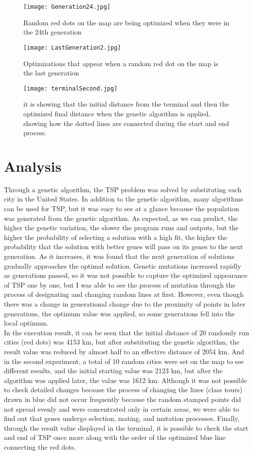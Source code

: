\documentclass[12pt]{article}
\begin{document}
\begin{figure}[h]
    \texttt{[image: Generation24.jpg]}
    \caption{\label{fig:reults}Random red dots on the map are being optimized when they were in the 24th generation}

    \texttt{[image: LastGeneration2.jpg]}
    \caption{\label{fig:reults}Optimizations that appear when a random red dot on the map is the last generation}
\end{figure}
\newpage
\begin{figure}[h]
    \texttt{[image: terminalSecond.jpg]}
    \caption{\label{fig:reults}it is showing that the initial distance from the terminal and then the optimized final distance when the genetic algorithm is applied, showing how the dotted lines are connected during the start and end process.} 
\end{figure}
    
\section*{Analysis}
Through a genetic algorithm, the TSP problem was solved by substituting each city in the United States. In addition to the genetic algorithm, many algorithms can be used for TSP, but it was easy to see at a glance because the population was generated from the genetic algorithm. As expected, as we can predict, the higher the genetic variation, the slower the program runs and outputs, but the higher the probability of selecting a solution with a high fit, the higher the probability that the solution with better genes will pass on its genes to the next generation. As it increases, it was found that the next generation of solutions gradually approaches the optimal solution. Genetic mutations increased rapidly as generations passed, so it was not possible to capture the optimized appearance of TSP one by one, but I was able to see the process of mutation through the process of designating and changing random lines at first. However, even though there was a change in generational change due to the proximity of points in later generations, the optimum value was applied, so some generations fell into the local optimum.\\

In the execution result, it can be seen that the initial distance of 20 randomly run cities (red dots) was 4153 km, but after substituting the genetic algorithm, the result value was reduced by almost half to an effective distance of 2054 km. And in the second experiment, a total of 10 random cities were set on the map to see different results, and the initial starting value was 2123 km, but after the algorithm was applied later, the value was 1612 km. Although it was not possible to check detailed changes because the process of changing the lines (class tours) drawn in blue did not occur frequently because the random stamped points did not spread evenly and were concentrated only in certain areas, we were able to find out that genes undergo selection, mating, and mutation processes. Finally, through the result value displayed in the terminal, it is possible to check the start and end of TSP once more along with the order of the optimized blue line connecting the red dots.
\end{document}
